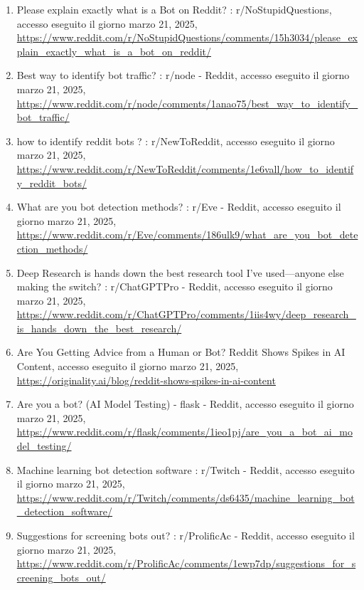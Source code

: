 \documentclass[
  12pt,
  letterpaper,
  DIV=11,
  numbers=noendperiod]{scrartcl}
\begin{document}
\begin{enumerate}
\item
  Please explain exactly what is a Bot on Reddit? : r/NoStupidQuestions,
  accesso eseguito il giorno marzo 21, 2025,
  \url{https://www.reddit.com/r/NoStupidQuestions/comments/15h3034/please_explain_exactly_what_is_a_bot_on_reddit/}\\
\item
  Best way to identify bot traffic? : r/node - Reddit, accesso eseguito
  il giorno marzo 21, 2025,
  \url{https://www.reddit.com/r/node/comments/1anao75/best_way_to_identify_bot_traffic/}\\
\item
  how to identify reddit bots ? : r/NewToReddit, accesso eseguito il
  giorno marzo 21, 2025,
  \url{https://www.reddit.com/r/NewToReddit/comments/1e6vall/how_to_identify_reddit_bots/}\\
\item
  What are you bot detection methods? : r/Eve - Reddit, accesso eseguito
  il giorno marzo 21, 2025,
  \url{https://www.reddit.com/r/Eve/comments/186ulk9/what_are_you_bot_detection_methods/}\\
\item
  Deep Research is hands down the best research tool I've used---anyone
  else making the switch? : r/ChatGPTPro - Reddit, accesso eseguito il
  giorno marzo 21, 2025,
  \url{https://www.reddit.com/r/ChatGPTPro/comments/1iis4wy/deep_research_is_hands_down_the_best_research/}\\
\item
  Are You Getting Advice from a Human or Bot? Reddit Shows Spikes in AI
  Content, accesso eseguito il giorno marzo 21, 2025,
  \url{https://originality.ai/blog/reddit-shows-spikes-in-ai-content}\\
\item
  Are you a bot? (AI Model Testing) - flask - Reddit, accesso eseguito
  il giorno marzo 21, 2025,
  \url{https://www.reddit.com/r/flask/comments/1ieo1pj/are_you_a_bot_ai_model_testing/}\\
\item
  Machine learning bot detection software : r/Twitch - Reddit, accesso
  eseguito il giorno marzo 21, 2025,
  \url{https://www.reddit.com/r/Twitch/comments/ds6435/machine_learning_bot_detection_software/}\\
\item
  Suggestions for screening bots out? : r/ProlificAc - Reddit, accesso
  eseguito il giorno marzo 21, 2025,
  \url{https://www.reddit.com/r/ProlificAc/comments/1ewp7dp/suggestions_for_screening_bots_out/}\\

\end{enumerate}
\end{document}
